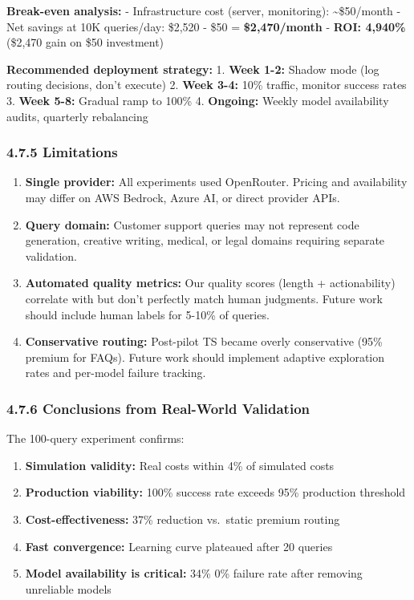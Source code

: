 \textbf{Break-even analysis:} - Infrastructure cost (server,
monitoring): \textasciitilde\$50/month - Net savings at 10K queries/day:
\$2,520 - \$50 = \textbf{\$2,470/month} - \textbf{ROI: 4,940\%} (\$2,470
gain on \$50 investment)

\textbf{Recommended deployment strategy:} 1. \textbf{Week 1-2:} Shadow
mode (log routing decisions, don't execute) 2. \textbf{Week 3-4:} 10\%
traffic, monitor success rates 3. \textbf{Week 5-8:} Gradual ramp to
100\% 4. \textbf{Ongoing:} Weekly model availability audits, quarterly
rebalancing

\hypertarget{limitations}{%
\subsubsection{4.7.5 Limitations}\label{limitations}}

\begin{enumerate}
\def\labelenumi{\arabic{enumi}.}
\item
  \textbf{Single provider:} All experiments used OpenRouter. Pricing and
  availability may differ on AWS Bedrock, Azure AI, or direct provider
  APIs.
\item
  \textbf{Query domain:} Customer support queries may not represent code
  generation, creative writing, medical, or legal domains requiring
  separate validation.
\item
  \textbf{Automated quality metrics:} Our quality scores (length +
  actionability) correlate with but don't perfectly match human
  judgments. Future work should include human labels for 5-10\% of
  queries.
\item
  \textbf{Conservative routing:} Post-pilot TS became overly
  conservative (95\% premium for FAQs). Future work should implement
  adaptive exploration rates and per-model failure tracking.
\end{enumerate}

\hypertarget{conclusions-from-real-world-validation}{%
\subsubsection{4.7.6 Conclusions from Real-World
Validation}\label{conclusions-from-real-world-validation}}

The 100-query experiment confirms:

\begin{enumerate}
\def\labelenumi{\arabic{enumi}.}
\tightlist
\item
  \textbf{Simulation validity:} Real costs within 4\% of simulated costs
\item
  \textbf{Production viability:} 100\% success rate exceeds 95\%
  production threshold
\item
  \textbf{Cost-effectiveness:} 37\% reduction vs.~static premium routing
\item
  \textbf{Fast convergence:} Learning curve plateaued after 20 queries
\item
  \textbf{Model availability is critical:} 34\% 0\% failure rate after
  removing unreliable models
\end{enumerate}

